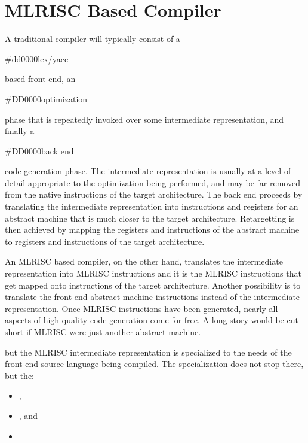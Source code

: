 \section{MLRISC Based Compiler}
    A traditional compiler will typically consist of a 
    \begin{color}{#dd0000}lex/yacc\end{color} based front end, an 
    \begin{color}{#DD0000}optimization\end{color} 
    phase that is repeatedly invoked
    over some intermediate representation, and finally a 
    \begin{color}{#DD0000}back end\end{color} 
    code generation phase. The intermediate
    representation is usually at a level of detail appropriate to the
    optimization being performed, and may be far removed from the
    native instructions of the target architecture. The back end
    proceeds by translating the intermediate representation into
    instructions and registers for an abstract machine that is much
    closer to the target architecture. Retargetting is then achieved
    by mapping the registers and instructions of the abstract machine
    to registers and instructions of the target architecture.



  An MLRISC based compiler, on the other hand, translates the
  intermediate representation into MLRISC instructions and it is the
  MLRISC instructions that get mapped onto instructions of the target
  architecture. Another possibility is to translate the front end
  abstract machine instructions instead of the intermediate
  representation.  Once MLRISC instructions have been generated,
  nearly all aspects of high quality code generation come for free. A
  long story would be cut short if MLRISC were just another abstract
  machine.

   but the MLRISC intermediate representation
  is specialized to the needs of the front end source language being
  compiled. The specialization does not stop there, but the:
   \begin{itemize}
  \item  {},
  \item  {}, and
  \item  {}
  \end{itemize}

